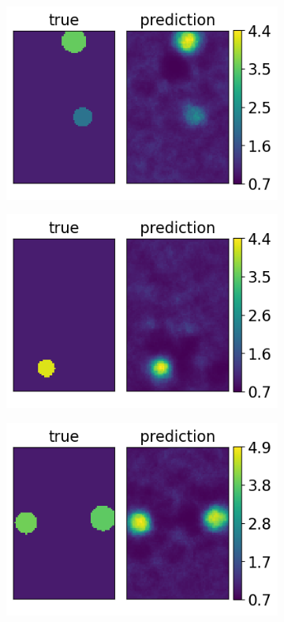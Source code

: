 \documentclass[12pt]{article}
\newcommand{\nhgappwidth}{0.24\linewidth}
\newcommand{\nhgappheight}{2.9cm}
\begin{document}
\begin{appendices}
\begin{figure}[!h]
\begin{subfigure}[c]{\nhgappwidth}
  \end{subfigure}
  \begin{subfigure}[c]{\nhgappwidth}
    \centering
    \includegraphics[totalheight=\nhgappheight]{Figures/AppendixNew/CNN1/ex7/mu.png}
  \end{subfigure}
  \begin{subfigure}[c]{\nhgappwidth}
    \centering
    \includegraphics[totalheight=\nhgappheight]{Figures/AppendixNew/CNN1/ex8/mu.png}
  \end{subfigure}
    \begin{subfigure}[c]{\nhgappwidth}
    \centering    
    \includegraphics[totalheight=\nhgappheight]{Figures/AppendixNew/CNN1/ex9/mu.png}

\end{subfigure}
\end{figure}
\end{appendices}
\end{document}
